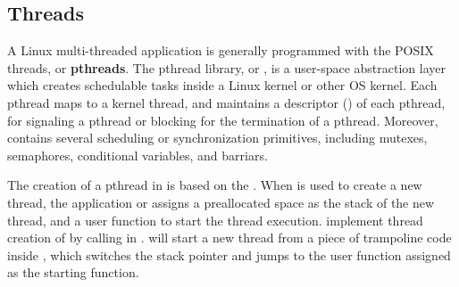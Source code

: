 \subsection{Threads}
\label{sec:libos:thread}


A Linux multi-threaded application
is generally programmed with the POSIX threads, or {\bf pthreads}.
The pthread library, or \libpthread{},
is a user-space abstraction layer
which creates schedulable tasks inside a Linux kernel or other OS kernel.
Each pthread maps to a kernel thread,
and \libpthread{} maintains a descriptor () of each pthread,
for signaling a pthread or blocking for the termination of a pthread.
Moreover,
\libpthread{}contains several scheduling or synchronization primitives, including mutexes, semaphores, conditional variables, and barriars.


The creation of a pthread in \libpthread{} is based on the  \linuxapi{}.
When  is used to create a new thread,
the application or \libpthread{} assigns a preallocated space as the stack of the new thread, and a user function to start the thread execution.
\thelibos{} implement thread creation of  by calling  in \thehostabi{}.
 will start a new thread from a piece of trampoline code inside \thelibos{}, which switches the stack pointer and jumps to the user function assigned as the starting function.









